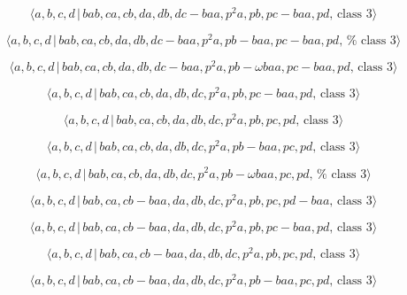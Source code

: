\documentclass[10pt]{article}
\begin{document}
\begin{equation}
\langle a,b,c,d\,|\,bab,ca,cb,da,db,dc-baa,p^2a,pb,pc-baa,pd,\,\text{class }%
3\rangle  \tag{7.3636}
\end{equation}

\begin{equation}
\langle a,b,c,d\,|\,bab,ca,cb,da,db,dc-baa,p^2a,pb-baa,pc-baa,pd,\,\text{%
class }3\rangle  \tag{7.3637}
\end{equation}

\begin{equation}
\langle a,b,c,d\,|\,bab,ca,cb,da,db,dc-baa,p^{2}a,pb-\omega baa,pc-baa,pd,\,%
\text{class }3\rangle  \tag{7.3638}
\end{equation}

\begin{equation}
\langle a,b,c,d\,|\,bab,ca,cb,da,db,dc,p^2a,pb,pc-baa,pd,\,\text{class }%
3\rangle  \tag{7.3639}
\end{equation}

\begin{equation}
\langle a,b,c,d\,|\,bab,ca,cb,da,db,dc,p^2a,pb,pc,pd,\,\text{class }3\rangle
\tag{7.3640}
\end{equation}

\begin{equation}
\langle a,b,c,d\,|\,bab,ca,cb,da,db,dc,p^2a,pb-baa,pc,pd,\,\text{class }%
3\rangle  \tag{7.3641}
\end{equation}

\begin{equation}
\langle a,b,c,d\,|\,bab,ca,cb,da,db,dc,p^{2}a,pb-\omega baa,pc,pd,\,\text{%
class }3\rangle  \tag{7.3642}
\end{equation}

\begin{equation}
\langle a,b,c,d\,|\,bab,ca,cb-baa,da,db,dc,p^2a,pb,pc,pd-baa,\,\text{class }%
3\rangle  \tag{7.3643}
\end{equation}

\begin{equation}
\langle a,b,c,d\,|\,bab,ca,cb-baa,da,db,dc,p^2a,pb,pc-baa,pd,\,\text{class }%
3\rangle  \tag{7.3644}
\end{equation}

\begin{equation}
\langle a,b,c,d\,|\,bab,ca,cb-baa,da,db,dc,p^2a,pb,pc,pd,\,\text{class }%
3\rangle  \tag{7.3645}
\end{equation}

\begin{equation}
\langle a,b,c,d\,|\,bab,ca,cb-baa,da,db,dc,p^2a,pb-baa,pc,pd,\,\text{class }%
3\rangle  \tag{7.3646}
\end{equation}
\end{document}
